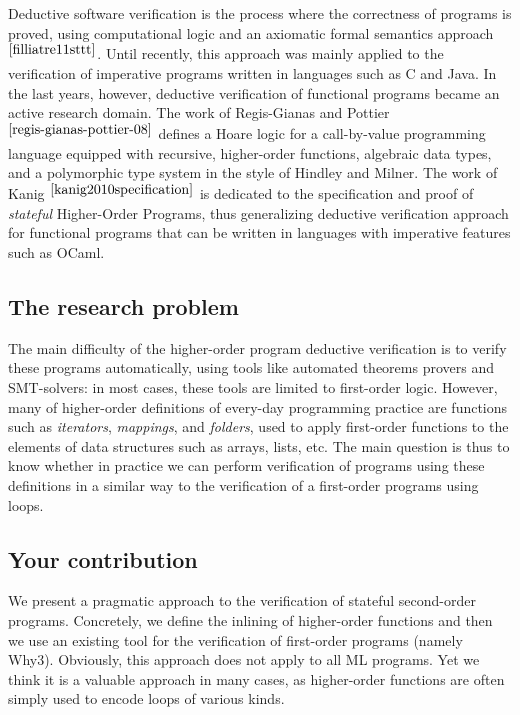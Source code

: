 \documentclass[a4paper,11pt,oneside]{article}
\theoremstyle{plain}
\begin{document}
Deductive software verification is the process where the correctness
of programs is proved, using computational logic and an axiomatic
formal semantics approach$^{\cite{filliatre11sttt}}$.  Until recently,
this approach was mainly applied to the verification of imperative
programs written in languages such as C and Java.  In the last years,
however, deductive verification of functional programs became an
active research domain.  The work of Regis-Gianas and
Pottier$^{\cite{regis-gianas-pottier-08}}$ defines a Hoare logic for a
call-by-value programming language equipped with recursive,
higher-order functions, algebraic data types, and a polymorphic type
system in the style of Hindley and Milner.  The work of
Kanig$^{~\cite{kanig2010specification}}$ is dedicated to the
specification and proof of \textit{stateful} Higher-Order Programs,
thus generalizing deductive verification approach for functional
programs that can be written in languages with imperative features
such as OCaml.

\subsection*{The research problem}
The main difficulty of the higher-order program deductive verification
is to verify these programs automatically, using tools like automated
theorems provers and SMT-solvers: in most cases, these tools are
limited to first-order logic.  However, many of higher-order
definitions of every-day programming practice are functions such as
\textit{iterators}, \textit{mappings}, and \textit{folders},
used to apply first-order functions to the elements
of data structures such as arrays, lists, etc.  The main question
is thus to know whether in practice we can perform verification of programs
using these definitions in a similar way to the verification of a
first-order programs using loops.

\subsection*{Your contribution}

We present a pragmatic approach to the verification of stateful
second-order programs.
Concretely, we define the inlining of higher-order functions and then
we use an existing tool for the verification of first-order programs
(namely Why3). Obviously, this approach does not apply to all ML
programs. Yet we think it is a valuable approach in many cases, as
higher-order functions are often simply used to encode loops of
various kinds.
\end{document}
